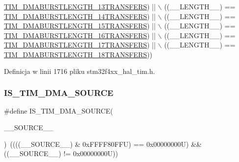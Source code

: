 \begin{DoxyCode}
      \hyperlink{group___t_i_m___d_m_a___burst___length_ga06a81eba628bea6495d86ebcc6021da0}{TIM\_DMABURSTLENGTH\_13TRANSFERS}) || \(\backslash\)
                                            ((\_\_LENGTH\_\_) == 
      \hyperlink{group___t_i_m___d_m_a___burst___length_ga5f430b76c0aeded0a8d8be779f26ae52}{TIM\_DMABURSTLENGTH\_14TRANSFERS}) || \(\backslash\)
                                            ((\_\_LENGTH\_\_) == 
      \hyperlink{group___t_i_m___d_m_a___burst___length_ga98a4d88c533178bc1b4347e4c5ce815a}{TIM\_DMABURSTLENGTH\_15TRANSFERS}) || \(\backslash\)
                                            ((\_\_LENGTH\_\_) == 
      \hyperlink{group___t_i_m___d_m_a___burst___length_gaf4b2a1fe12c52272544c21e17de1ed90}{TIM\_DMABURSTLENGTH\_16TRANSFERS}) || \(\backslash\)
                                            ((\_\_LENGTH\_\_) == 
      \hyperlink{group___t_i_m___d_m_a___burst___length_gad31c1fca7ed436a53efc4f290144584d}{TIM\_DMABURSTLENGTH\_17TRANSFERS}) || \(\backslash\)
                                            ((\_\_LENGTH\_\_) == 
      \hyperlink{group___t_i_m___d_m_a___burst___length_gabb6f72b02ee1c8855de241cb0713e2ca}{TIM\_DMABURSTLENGTH\_18TRANSFERS}))
\end{DoxyCode}


Definicja w linii 1716 pliku stm32f4xx\+\_\+hal\+\_\+tim.\+h.

\mbox{\label{group___t_i_m___private___macros_ga6a33061de13fdde7df1a85d2402e69c9}} 
\subsubsection{\texorpdfstring{I\+S\+\_\+\+T\+I\+M\+\_\+\+D\+M\+A\+\_\+\+S\+O\+U\+R\+CE}{IS\_TIM\_DMA\_SOURCE}}
{\footnotesize\ttfamily \#define I\+S\+\_\+\+T\+I\+M\+\_\+\+D\+M\+A\+\_\+\+S\+O\+U\+R\+CE(\begin{DoxyParamCaption}\item[{}]{\+\_\+\+\_\+\+S\+O\+U\+R\+C\+E\+\_\+\+\_\+ }\end{DoxyParamCaption})~((((\+\_\+\+\_\+\+S\+O\+U\+R\+C\+E\+\_\+\+\_\+) \& 0x\+F\+F\+F\+F80\+F\+F\+U) == 0x00000000\+U) \&\& ((\+\_\+\+\_\+\+S\+O\+U\+R\+C\+E\+\_\+\+\_\+) != 0x00000000\+U))}



